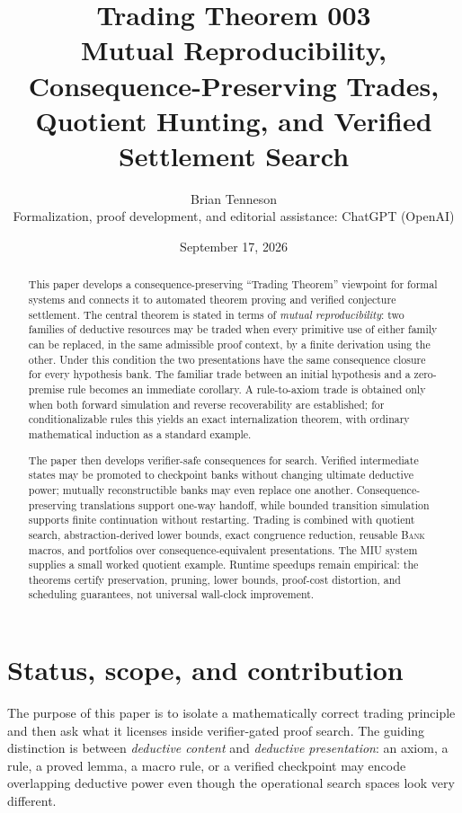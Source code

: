 \documentclass[11pt]{article}
\title{\textbf{Trading Theorem 003}\\[0.4em]
\large Mutual Reproducibility, Consequence-Preserving Trades, Quotient Hunting, and Verified Settlement Search}
\author{Brian Tenneson\\[0.4em]\small Formalization, proof development, and editorial assistance: ChatGPT (OpenAI)}
\date{September 17, 2026}
\theoremstyle{definition}
\theoremstyle{remark}
\newcommand{\BANK}{\textsc{Bank}}
\begin{document}
\maketitle

\begin{abstract}
This paper develops a consequence-preserving ``Trading Theorem'' viewpoint for formal systems and connects it to automated theorem proving and verified conjecture settlement. The central theorem is stated in terms of \emph{mutual reproducibility}: two families of deductive resources may be traded when every primitive use of either family can be replaced, in the same admissible proof context, by a finite derivation using the other. Under this condition the two presentations have the same consequence closure for every hypothesis bank. The familiar trade between an initial hypothesis and a zero-premise rule becomes an immediate corollary. A rule-to-axiom trade is obtained only when both forward simulation and reverse recoverability are established; for conditionalizable rules this yields an exact internalization theorem, with ordinary mathematical induction as a standard example.

The paper then develops verifier-safe consequences for search. Verified intermediate states may be promoted to checkpoint banks without changing ultimate deductive power; mutually reconstructible banks may even replace one another. Consequence-preserving translations support one-way handoff, while bounded transition simulation supports finite continuation without restarting. Trading is combined with quotient search, abstraction-derived lower bounds, exact congruence reduction, reusable \BANK{} macros, and portfolios over consequence-equivalent presentations. The MIU system supplies a small worked quotient example. Runtime speedups remain empirical: the theorems certify preservation, pruning, lower bounds, proof-cost distortion, and scheduling guarantees, not universal wall-clock improvement.
\end{abstract}

\section{Status, scope, and contribution}
The purpose of this paper is to isolate a mathematically correct trading principle and then ask what it licenses inside verifier-gated proof search. The guiding distinction is between \emph{deductive content} and \emph{deductive presentation}: an axiom, a rule, a proved lemma, a macro rule, or a verified checkpoint may encode overlapping deductive power even though the operational search spaces look very different.
\end{document}
